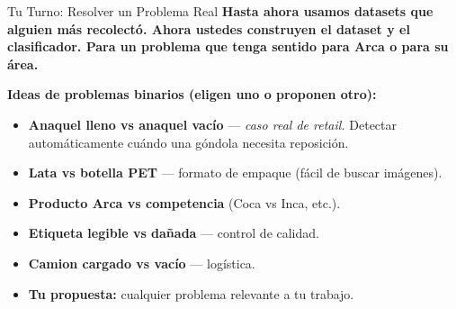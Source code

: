 \documentclass[aspectratio=169, 11pt]{beamer}
\begin{document}
\begin{frame}[shrink]{Tu Turno: Resolver un Problema Real}
  \vspace{6pt}
  {\footnotesize\color{arcaDark}\bfseries
    Hasta ahora usamos datasets que alguien m\'as recolect\'o. Ahora
    \textbf{ustedes} construyen el dataset \textbf{y} el clasificador.
    Para un problema que tenga sentido para Arca o para su \'area.}

  \vspace{14pt}
  {\footnotesize\color{arcaDark}\bfseries Ideas de problemas binarios (eligen uno o proponen otro):}

  \vspace{6pt}
  {\footnotesize
  \begin{itemize}\setlength{\itemsep}{4pt}
    \item[{\color{arcaRed}\scriptsize\faArrowRight}]
      \textbf{Anaquel lleno vs anaquel vac\'io} ---
      \emph{caso real de retail.} Detectar autom\'aticamente cu\'ando una g\'ondola
      necesita reposici\'on.
    \item[{\color{arcaRed}\scriptsize\faArrowRight}]
      \textbf{Lata vs botella PET} --- formato de empaque (f\'acil de buscar im\'agenes).
    \item[{\color{arcaRed}\scriptsize\faArrowRight}]
      \textbf{Producto Arca vs competencia} (Coca vs Inca, etc.).
    \item[{\color{arcaRed}\scriptsize\faArrowRight}]
      \textbf{Etiqueta legible vs da\~nada} --- control de calidad.
    \item[{\color{arcaRed}\scriptsize\faArrowRight}]
      \textbf{Camion cargado vs vac\'io} --- log\'istica.
    \item[{\color{codeGreen}\scriptsize\faArrowRight}]
      \textbf{Tu propuesta:} cualquier problema relevante a tu trabajo.
  \end{itemize}
  }
\end{frame}
\end{document}
